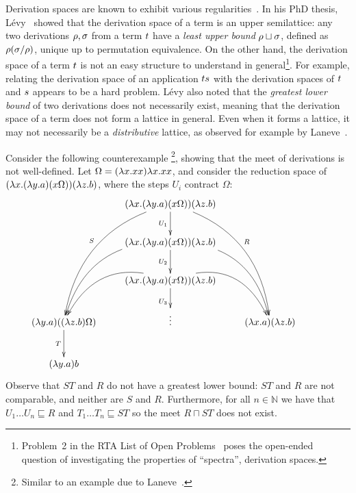 Derivation spaces are known to exhibit various
regularities~\cite{Tesis:Levy:1978,DBLP:journals/tcs/Zilli84,laneve1994distributive,thesismellies,levy_redex_stability,DBLP:conf/lics/AspertiL13}.
In his PhD thesis, L\'evy~\cite{Tesis:Levy:1978} showed that the derivation space of a term is
an upper semilattice: any two derivations $\rho,\sigma$ from a term $t$
have a {\em least upper bound} $\rho \sqcup \sigma$, defined as $\rho(\sigma/\rho)$,
unique up to permutation equivalence.
On the other hand, the derivation space of a term $t$ is not an easy structure to understand in general\footnote{Problem~2 in
the RTA List of Open Problems~\cite{dershowitz1991open} poses
the open-ended question of investigating the properties of ``spectra'', \ie derivation spaces.}.
For example, relating the derivation space of an application $ts$
with the derivation spaces of $t$ and $s$ appears to be a hard problem.
L\'evy also noted that the {\em greatest lower bound} of two derivations does
not necessarily exist, meaning that the derivation space of a term does not form a lattice in general.
Even when it forms a lattice, it may not necessarily be a {\em distributive} lattice, as observed for example by
Laneve~\cite{laneve1994distributive}.

Consider the following counterexample
\footnote{Similar to an example due to Laneve~\cite{laneve1994distributive}.}, showing that the meet of derivations is not well-defined.
Let $\Omega = (\lambda x. xx)\lambda x. xx$,
and consider the reduction space of
  $(\lambda x. (\lambda y. a)(x \Omega)) (\lambda z. b)$,
where the steps $U_i$ contract $\Omega$:
\[
  \xymatrix{
    &
    (\lam{\var}{(\lam{\vartwo}{a})(\var \Omega)}) (\lam{\varthree}{b})
    \ar_{U_1}[d]
    \ar@/_1cm/_{S}[dddl]
    \ar@/^1cm/^{R}[dddr]
    &
  \\
    &
    (\lam{\var}{(\lam{\vartwo}{a})(\var \Omega)}) (\lam{\varthree}{b})
    \ar@/_1cm/[ddl] \ar@/^1cm/[ddr]
    \ar_{U_2}[d]
    &
  \\
    &
    (\lam{\var}{(\lam{\vartwo}{a})(\var \Omega)}) (\lam{\varthree}{b})
    \ar@/_1cm/[dl] \ar@/^1cm/[dr]
    \ar_{U_3}[d]
    &
  \\
    (\lam{\vartwo}{a})((\lam{\varthree}{b}) \Omega)
    \ar_{T}[d]
    &
    \vdots
    &
    (\lam{\var}{a})(\lam{\varthree}{b})
  \\
    (\lam{\vartwo}{a}) b
    &
    &
    &
  }
\]
Observe that $ST$ and $R$ do not have a greatest lower bound: $ST$ and $R$ are not
comparable, and neither are $S$ and $R$.
Furthermore, for all $n \in \mathbb{N}$ we have that $U_1 \hdots U_n \sqsubseteq R$
and $T_1 \hdots T_n \sqsubseteq ST$ so the meet $R \sqcap ST$ does not exist.


